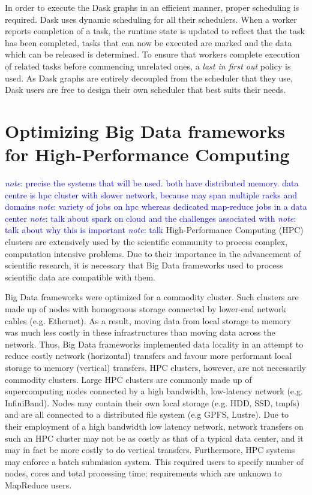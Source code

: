 \documentclass{report}
\newcommand{\note}[1]{\textcolor{blue}{\textit{note}: #1}}
\begin{document}
        In order to execute the Dask graphs in an efficient manner, proper 
        scheduling is required. Dask uses dynamic scheduling for all their 
        schedulers. When a worker reports completion of a task, the runtime 
        state is updated to reflect that the task has been completed, tasks that
        can now be executed are marked and the data which can be released is 
        determined. To ensure that workers complete execution of related tasks 
        before commencing unrelated ones, a \textit{last in first out} policy is
        used. As Dask graphs are entirely decoupled from the scheduler that they
        use, Dask users are free to design their own scheduler that best suits 
        their needs.


\chapter{Optimizing Big Data frameworks for High-Performance Computing}
	
    \note{precise the systems that will be used. both have distributed memory.
    data centre is hpc cluster with slower network, because may span multiple
    racks and domains} \note{variety of jobs on hpc whereas dedicated map-reduce
    jobs in a data center} \note{talk about spark on cloud and the challenges
    associated with} \note{talk about why this is important} \note{talk }
    High-Performance Computing (HPC) clusters are extensively used by the
    scientific community to process complex, computation intensive problems. Due
    to their importance in the advancement of scientific research, it is
    necessary that Big Data frameworks used to process scientific data are
    compatible with them. 
	
    Big Data frameworks were optimized for a commodity cluster.  Such clusters
    are made up of nodes with homogenous storage connected by lower-end network
    cables (e.g. Ethernet). As a result, moving data from local storage to
    memory was much less costly in these infrastructures than moving data across
    the network. Thus, Big Data frameworks implemented data locality in an
    attempt to reduce costly network (horizontal) transfers and favour more
    performant local storage to memory (vertical) transfers. HPC clusters,
    however, are not necessarily commodity clusters. Large HPC clusters are
    commonly made up of supercomputing nodes connected by a high bandwidth,
    low-latency network (e.g.  InfiniBand). Nodes may contain their own local
    storage (e.g. HDD, SSD, tmpfs) and are all connected to a distributed file
    system (e.g GPFS, Lustre).  Due to their employment of a high bandwidth low
    latency network, network transfers on such an HPC cluster may not be as
    costly as that of a typical data center, and it may in fact be more costly
    to do vertical transfers. Furthermore, HPC systems may enforce a batch
    submission system. This required users to specify number of nodes, cores and
    total processing time; requirements which are unknown to MapReduce users.
	
\end{document}
